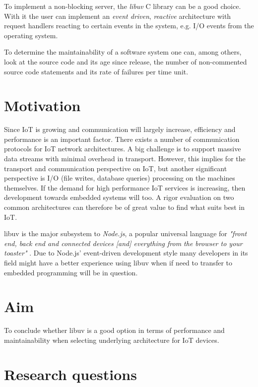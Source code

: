 To implement a non-blocking server, the \textit{libuv} C library can be a good
choice. With it the user can implement an \textit{event driven},
\textit{reactive} architecture with request handlers reacting to certain events
in the system, e.g. I/O events from the operating system. \cite{libuv-webpage}

To determine the maintainability of a software system one can, among others,
look at the source code and its age since release, the number of non-commented
source code statements and its rate of failures per time unit.
\cite{oman1992metrics}

\section{Motivation}
\label{sec:motivation}

Since IoT is growing and communication will largely increase, efficiency and
performance is an important factor. There exists a number of communication
protocols for IoT network architectures. A big challenge is to support massive
data streams with minimal overhead in transport. However, this implies for the
transport and communication perspective on IoT, but another significant
perspective is I/O (file writes, database queries) processing on the machines
themselves. If the demand for high performance IoT services is increasing, then
development towards embedded systems will too. A rigor evaluation on two common
architectures can therefore be of great value to find what suits best in IoT.

libuv is the major subsystem to \textit{Node.js}, a popular universal language
for \textit{"front end, back end and connected devices [and] everything from
the browser to your toaster"} \cite{node-js-survey-report-2016}. Due to
Node.js' event-driven development style many developers in its field might have
a better experience using libuv when if need to transfer to embedded
programming will be in question.

\section{Aim}
\label{sec:aim}

To conclude whether libuv is a good option in terms of performance and
maintainability when selecting underlying architecture for IoT devices.

\section{Research questions}
\label{sec:research-questions}

